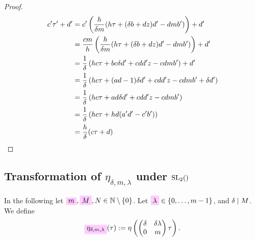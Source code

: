 \documentclass{article}
\begin{document}
\begin{proof}
\begin{align*}
  c'\tau'+d'
  &=
  c'
    \left(
    \frac{h}{\delta m}(h\tau + (\delta b + d z) d' - d m b')
    \right) + d'\\
  &=
    \frac{c m}{h}
    \left(
    \frac{h}{\delta m}(h \tau + (\delta b + d z) d' - d m b')
    \right) + d'\\
  &=
    \frac{1}{\delta}
    \left(
    h c \tau + b c \delta d' + c d d' z - c d m b'
    \right) + d'\\
  &=
    \frac{1}{\delta}
    \left(
    h c \tau + (a d - 1) \delta d' + c d d' z - c d m b'
    + \delta d'
    \right)\\
  &=
    \frac{1}{\delta}
    \left(
    h c \tau + a d \delta d' + c d d' z - c d m b'
    \right)\\
  &=
    \frac{1}{\delta}
    \left(
    h c \tau + h d (a' d' - c' b')
    \right)\\
  &=
    \frac{h}{\delta} (c\tau + d)
\end{align*}
\end{proof}
\endgroup












\subsection{Transformation of $\eta_{\delta,m,\lambda}$ under $\SL2Z$}
  \label{sec:transformation-eta_delta-m-lambda}

In the following let
$\defineNotation[m]{m},
\defineNotation[M]{M},
N \in \setN \setminus \Set{0}$.
%
Let $\defineNotation[lambda]{\lambda} \in \Set{0,\ldots,m-1}$, and
$\delta \mid M$.
%
We define
\begin{gather}
  \defineNotation[eta-delta-m-lambda-tau]{\eta_{\delta,m,\lambda}}(\tau)
  := \eta \left(
    \begin{pmatrix}\delta& \delta \lambda\\0&m\end{pmatrix} \tau
  \right).
\label{eq:eta_delta-m-lambda(tau)}
\end{gather}
\end{document}
